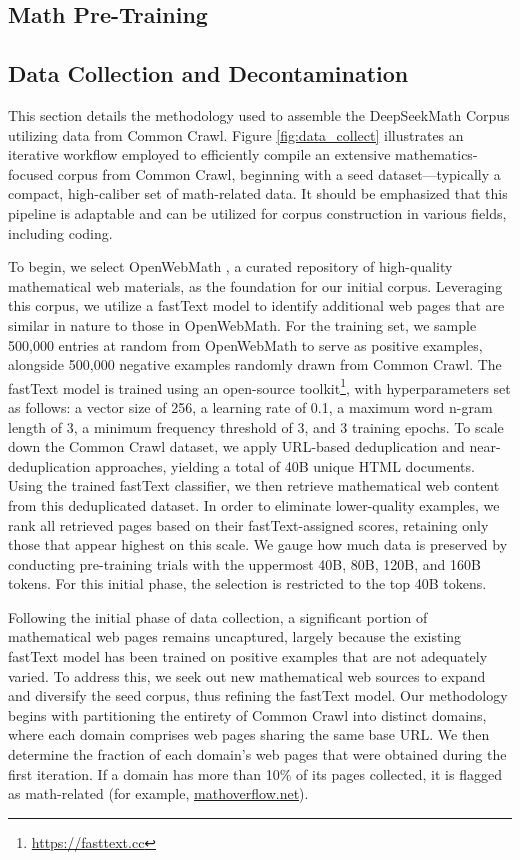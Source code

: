 \begin{itemize}[topsep=0pt]
\section{Math Pre-Training}

\subsection{Data Collection and Decontamination} This section details the methodology used to assemble the DeepSeekMath Corpus utilizing data from Common Crawl. Figure \ref{fig:data_collect} illustrates an iterative workflow employed to efficiently compile an extensive mathematics-focused corpus from Common Crawl, beginning with a seed dataset—typically a compact, high-caliber set of math-related data. It should be emphasized that this pipeline is adaptable and can be utilized for corpus construction in various fields, including coding.

To begin, we select OpenWebMath \citep{openwebmath}, a curated repository of high-quality mathematical web materials, as the foundation for our initial corpus. Leveraging this corpus, we utilize a fastText model \citep{joulin2016fasttext} to identify additional web pages that are similar in nature to those in OpenWebMath. For the training set, we sample 500,000 entries at random from OpenWebMath to serve as positive examples, alongside 500,000 negative examples randomly drawn from Common Crawl. The fastText model is trained using an open-source toolkit\footnote{\url{https://fasttext.cc}}, with hyperparameters set as follows: a vector size of 256, a learning rate of 0.1, a maximum word n-gram length of 3, a minimum frequency threshold of 3, and 3 training epochs. To scale down the Common Crawl dataset, we apply URL-based deduplication and near-deduplication approaches, yielding a total of 40B unique HTML documents. Using the trained fastText classifier, we then retrieve mathematical web content from this deduplicated dataset. In order to eliminate lower-quality examples, we rank all retrieved pages based on their fastText-assigned scores, retaining only those that appear highest on this scale. We gauge how much data is preserved by conducting pre-training trials with the uppermost 40B, 80B, 120B, and 160B tokens. For this initial phase, the selection is restricted to the top 40B tokens.

Following the initial phase of data collection, a significant portion of mathematical web pages remains uncaptured, largely because the existing fastText model has been trained on positive examples that are not adequately varied. To address this, we seek out new mathematical web sources to expand and diversify the seed corpus, thus refining the fastText model. Our methodology begins with partitioning the entirety of Common Crawl into distinct domains, where each domain comprises web pages sharing the same base URL. We then determine the fraction of each domain's web pages that were obtained during the first iteration. If a domain has more than 10\% of its pages collected, it is flagged as math-related (for example, \url{mathoverflow.net}).


\end{itemize}
